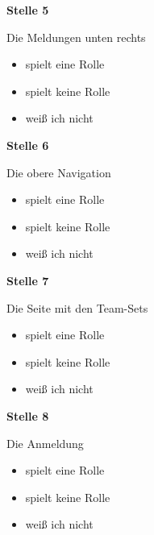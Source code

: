 \medskip

\noindent\begin{minipage}{\linewidth}
\textbf{Stelle 5}\par
Die Meldungen unten rechts

\begin{itemize}[nosep,leftmargin=2.4em]
\item[\kreuz] spielt eine Rolle
\item[\kreuz] spielt keine Rolle
\item[\kreuz] weiß ich nicht
\end{itemize}
\end{minipage}

\medskip

\noindent\begin{minipage}{\linewidth}
\textbf{Stelle 6}\par
Die obere Navigation

\begin{itemize}[nosep,leftmargin=2.4em]
\item[\kreuz] spielt eine Rolle
\item[\kreuz] spielt keine Rolle
\item[\kreuz] weiß ich nicht
\end{itemize}
\end{minipage}

\medskip

\noindent\begin{minipage}{\linewidth}
\textbf{Stelle 7}\par
Die Seite mit den Team-Sets

\begin{itemize}[nosep,leftmargin=2.4em]
\item[\kreuz] spielt eine Rolle
\item[\kreuz] spielt keine Rolle
\item[\kreuz] weiß ich nicht
\end{itemize}
\end{minipage}

\medskip

\noindent\begin{minipage}{\linewidth}
\textbf{Stelle 8}\par
Die Anmeldung

\begin{itemize}[nosep,leftmargin=2.4em]
\item[\kreuz] spielt eine Rolle
\item[\kreuz] spielt keine Rolle
\item[\kreuz] weiß ich nicht
\end{itemize}
\end{minipage}

\medskip

